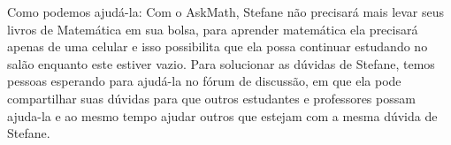 Como podemos ajudá-la: Com o AskMath, Stefane não precisará mais levar seus livros de Matemática em sua bolsa, para aprender matemática ela precisar\'a apenas de uma celular e isso possibilita que 
ela possa continuar estudando no salão enquanto este estiver vazio. Para solucionar as dúvidas de Stefane, 
temos pessoas esperando para ajudá-la no f\'orum de discuss\~ao, em que ela pode compartilhar suas d\'uvidas para que outros estudantes e professores possam ajuda-la e ao mesmo tempo ajudar outros 
que estejam com a mesma d\'uvida de Stefane. 

